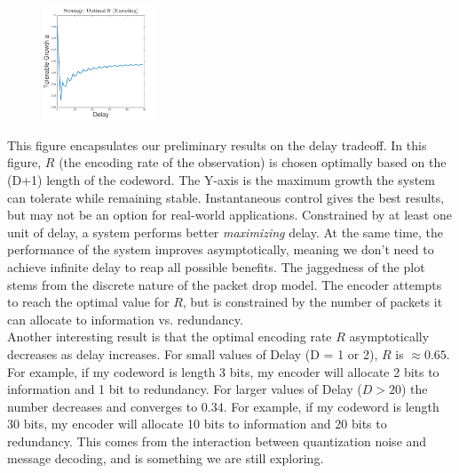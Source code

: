 \documentclass[10pt]{article}
\begin{document}

\begin{figure}
  \vspace{-20pt}
  \begin{center}
    \includegraphics[width=0.3\textwidth]{150430_Dvsa}
  \end{center}
  \vspace{-20pt}
\end{figure}

This figure encapsulates our preliminary results on the delay tradeoff. In this figure, $R$ (the encoding rate of the observation) is chosen optimally based on the (D+1) length of the codeword. The Y-axis is the maximum growth the system can tolerate while remaining stable. Instantaneous control gives the best results, but may not be an option for real-world applications. Constrained by at least one unit of delay, a system performs better \textit{maximizing} delay. At the same time, the performance of the system improves asymptotically, meaning we don't need to achieve infinite delay to reap all possible benefits. The jaggedness of the plot stems from the discrete nature of the packet drop model. The encoder attempts to reach the optimal value for $R$, but is constrained by the number of packets it can allocate to information vs. redundancy.\\

Another interesting result is that the optimal encoding rate $R$ asymptotically decreases as delay increases. For small values of Delay (D = 1 or 2), $R$ is $\approx 0.65$. For example, if my codeword is length 3 bits, my encoder will allocate 2 bits to information and 1 bit to redundancy. For larger values of Delay ($D > 20$) the number decreases and converges to 0.34. For example, if my codeword is length 30 bits, my encoder will allocate 10 bits to information and 20 bits to redundancy. This comes from the interaction between quantization noise and message decoding, and is something we are still exploring.
\vspace{-10pt}
\end{document}
